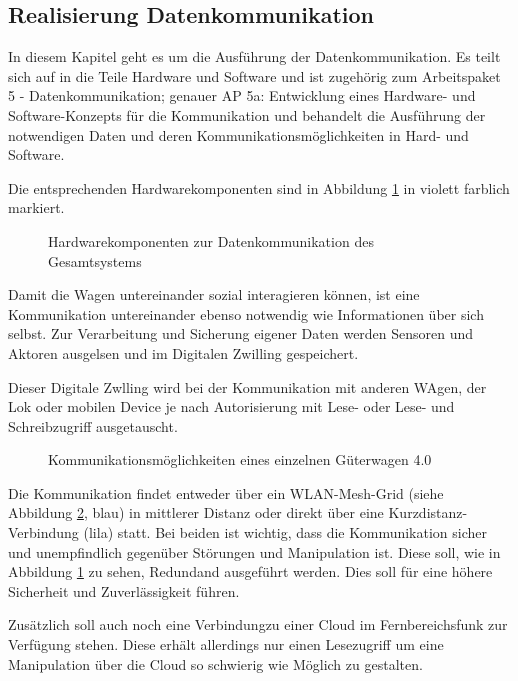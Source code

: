 \subsection{Realisierung Datenkommunikation}\label{sec:dKomp}
In diesem Kapitel geht es um die Ausführung der Datenkommunikation. Es teilt sich auf in die Teile Hardware und Software und ist zugehörig zum Arbeitspaket 5 - Datenkommunikation; genauer AP 5a: Entwicklung eines Hardware- und Software-Konzepts für die Kommunikation und behandelt die Ausführung der notwendigen Daten und deren Kommunikationsmöglichkeiten in Hard- und Software.\par
Die entsprechenden Hardwarekomponenten sind in Abbildung \ref{fig:dKomp} in violett farblich markiert.
\begin{figure}[hbt]
    \centering
    
    \caption{Hardwarekomponenten zur Datenkommunikation des Gesamtsystems}
    \label{fig:dKomp}
\end{figure}
Damit die Wagen untereinander sozial interagieren können, ist eine Kommunikation untereinander ebenso notwendig wie Informationen über sich selbst. Zur Verarbeitung und Sicherung eigener Daten werden Sensoren und Aktoren ausgelsen und im Digitalen Zwilling gespeichert.\par
Dieser Digitale Zwlling wird bei der Kommunikation mit anderen WAgen, der Lok oder mobilen Device je nach Autorisierung mit Lese- oder Lese- und Schreibzugriff ausgetauscht.\par
\begin{figure}[hbt]
    \centering
    
    \caption{Kommunikationsmöglichkeiten eines einzelnen Güterwagen 4.0\cite{autonBetrieb}}
    \label{fig:Wagenkomm}
\end{figure}
Die Kommunikation findet entweder über ein WLAN-Mesh-Grid (siehe Abbildung \ref{fig:Wagenkomm}, blau) in mittlerer Distanz oder direkt über eine Kurzdistanz-Verbindung (lila) statt. Bei beiden ist wichtig, dass die Kommunikation sicher und unempfindlich gegenüber Störungen und Manipulation ist. Diese soll, wie in Abbildung \ref{fig:dKomp} zu sehen, Redundand ausgeführt werden. Dies soll für eine höhere Sicherheit und Zuverlässigkeit führen. \par
Zusätzlich soll auch noch eine Verbindungzu einer Cloud im Fernbereichsfunk zur Verfügung stehen. Diese erhält allerdings nur einen Lesezugriff um eine Manipulation über die Cloud so schwierig wie Möglich zu gestalten.\par
